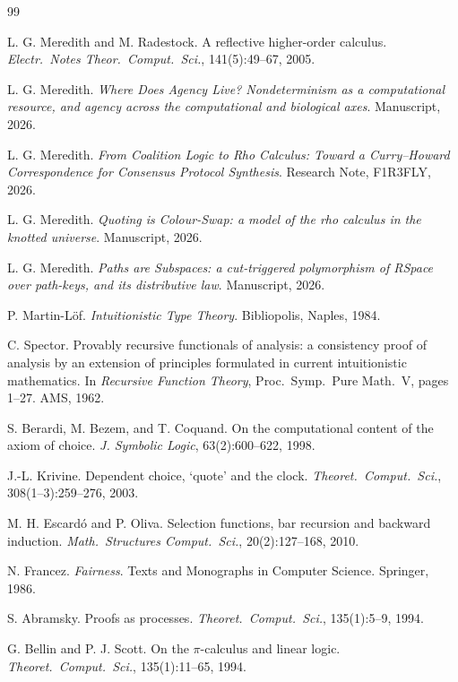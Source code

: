 \documentclass[11pt]{article}
\theoremstyle{definition}
\theoremstyle{plain}
\theoremstyle{remark}
\begin{document}
\begin{thebibliography}{99}

 L. G. Meredith and M. Radestock. A reflective higher-order calculus.
\emph{Electr.\ Notes Theor.\ Comput.\ Sci.}, 141(5):49--67, 2005.

 L. G. Meredith. \emph{Where Does Agency Live? Nondeterminism as a computational resource,
and agency across the computational and biological axes}. Manuscript, 2026.

 L. G. Meredith. \emph{From Coalition Logic to Rho Calculus: Toward a Curry--Howard
Correspondence for Consensus Protocol Synthesis}. Research Note, F1R3FLY, 2026.

 L. G. Meredith. \emph{Quoting is Colour-Swap: a model of the rho calculus in the knotted
universe}. Manuscript, 2026.

 L. G. Meredith. \emph{Paths are Subspaces: a cut-triggered polymorphism of RSpace over
path-keys, and its distributive law}. Manuscript, 2026.

 P. Martin-L\"of. \emph{Intuitionistic Type Theory}. Bibliopolis, Naples, 1984.

 C. Spector. Provably recursive functionals of analysis: a consistency proof of analysis by
an extension of principles formulated in current intuitionistic mathematics. In \emph{Recursive Function Theory},
Proc.\ Symp.\ Pure Math.\ V, pages 1--27. AMS, 1962.

 S. Berardi, M. Bezem, and T. Coquand. On the computational content of the axiom of choice.
\emph{J. Symbolic Logic}, 63(2):600--622, 1998.

 J.-L. Krivine. Dependent choice, `quote' and the clock. \emph{Theoret.\ Comput.\ Sci.},
308(1--3):259--276, 2003.

 M. H. Escard\'o and P. Oliva. Selection functions, bar recursion and backward induction.
\emph{Math.\ Structures Comput.\ Sci.}, 20(2):127--168, 2010.

 N. Francez. \emph{Fairness}. Texts and Monographs in Computer Science. Springer, 1986.

 S. Abramsky. Proofs as processes. \emph{Theoret.\ Comput.\ Sci.}, 135(1):5--9, 1994.

 G. Bellin and P. J. Scott. On the $\pi$-calculus and linear logic. \emph{Theoret.\
Comput.\ Sci.}, 135(1):11--65, 1994.


\end{thebibliography}
\end{document}
